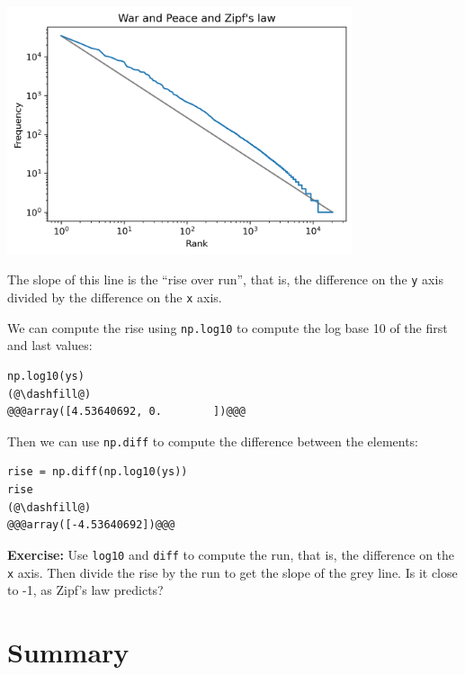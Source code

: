 \begin{center}
\includegraphics[width=4in]{06_plotting_files/06_plotting_84_0.png}
\end{center}

The slope of this line is the ``rise over run'', that is, the difference
on the \passthrough{\lstinline!y!} axis divided by the difference on the
\passthrough{\lstinline!x!} axis.

We can compute the rise using \passthrough{\lstinline!np.log10!} to
compute the log base 10 of the first and last values:

\begin{lstlisting}[]
np.log10(ys)
(@\dashfill@)
@@@array([4.53640692, 0.        ])@@@
\end{lstlisting}

Then we can use \passthrough{\lstinline!np.diff!} to compute the
difference between the elements:

\begin{lstlisting}[]
rise = np.diff(np.log10(ys))
rise
(@\dashfill@)
@@@array([-4.53640692])@@@
\end{lstlisting}

\textbf{Exercise:} Use \passthrough{\lstinline!log10!} and
\passthrough{\lstinline!diff!} to compute the run, that is, the
difference on the \passthrough{\lstinline!x!} axis. Then divide the rise
by the run to get the slope of the grey line. Is it close to -1, as
Zipf's law predicts?

\hypertarget{summary}{%
\section{Summary}\label{summary}}

